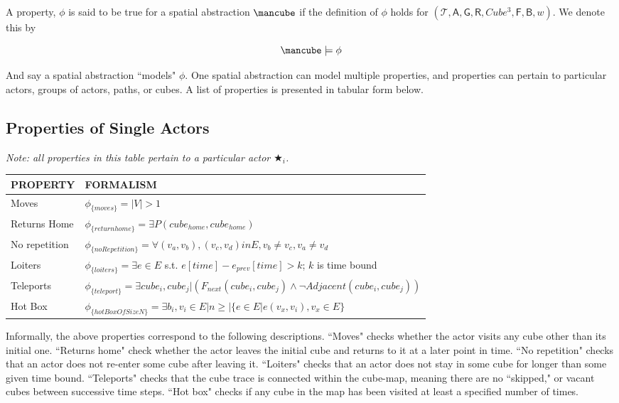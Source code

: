 A property, $\phi$ is said to be true for a spatial abstraction $\cube$ if the definition of $\phi$ holds for $(\mathcal{T}, \mathsf{A}, \mathsf{G}, \mathsf{R}, Cube^3, \mathsf{F}, \mathsf{B}, w)$.
We denote this by 

\begin{equation}
  \cube \models \phi
\end{equation}

And say a spatial abstraction ``models" $\phi$.
One spatial abstraction can model multiple properties, and properties can pertain to particular actors, groups of actors, paths, or cubes.
A list of properties is presented in tabular form below.

\subsection{Properties of Single Actors}

\emph{Note: all properties in this table pertain to a particular actor $\bigstar_i$.}
\begin{tabular}{| p{2.8cm} | p{11.5cm} | }
\hline
PROPERTY & FORMALISM \\ \hline
Moves & $\phi_{\{moves\}} = |V| > 1$ \\ \hline
Returns Home & $\phi_{\{returnhome\}} = \exists P(cube_{home}, cube_{home})$ \\ \hline
No repetition & $\phi_{\{noRepetition\}} = \forall (v_a, v_b), (v_c,v_d) in E, v_b \neq v_c, v_a \neq v_d$ \\ \hline
 Loiters & $\phi_{\{loiters\}} =  \exists e \in E$ s.t. $e[time] - e_{prev}[time] > k$; $k$ is time bound \\ \hline
Teleports & $\phi_{\{teleport\}}=  \exists  cube_i, cube_j | (F_{next}(cube_i, cube_j) \land \lnot Adjacent(cube_i, cube_j))$ \\ \hline
Hot Box & $\phi_{\{hotBoxOfSizeN\}} = \exists b_i, v_i \in E | n \geq |\{e \in E | e(v_x, v_i), v_x \in E\}$ \\ \hline
\end{tabular}

Informally, the above properties correspond to the following descriptions.
``Moves" checks whether the actor visits any cube other than its initial one.
``Returns home" check whether the actor leaves the initial cube and returns to it at a later point in time.
``No repetition" checks that an actor does not re-enter some cube after leaving it.
``Loiters" checks that an actor does not stay in some cube for longer than some given time bound.
``Teleports" checks that the cube trace is connected within the cube-map, meaning there are no ``skipped," or vacant cubes between successive time steps.
``Hot box" checks if any cube in the map has been visited at least a specified number of times.


